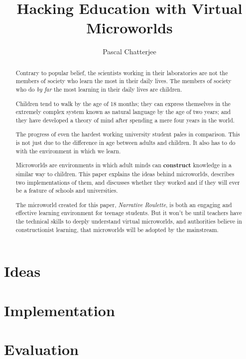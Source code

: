 \documentclass[a4paper]{report}
\title{Hacking Education with Virtual Microworlds}
\author{Pascal Chatterjee}
\begin{document}
\maketitle

\begin{abstract}
Contrary to popular belief, the scientists working in their laboratories are not the members of society who learn the most in their daily lives. The members of society who do \textit{by far} the most learning in their daily lives are children. 

Children tend to walk by the age of 18 months; they can express themselves in the extremely complex system known as natural language by the age of two years; and they have developed a theory of mind after spending a mere four years in the world. 

The progress of even the hardest working university student pales in comparison. This is not just due to the difference in age between adults and children. It also has to do with the environment in which we learn.

Microworlds are environments in which adult minds can \textbf{construct} knowledge in a similar way to children. This paper explains the ideas behind microworlds, describes two implementations of them, and discusses whether they worked and if they will ever be a feature of schools and universities. 

The microworld created for this paper, \textit{Narrative Roulette}, is both an engaging and effective learning environment for teenage students. But it won't be until teachers have the technical skills to deeply understand virtual microworlds, and authorities believe in constructionist learning, that microworlds will be adopted by the mainstream.
\end{abstract}

\tableofcontents

\chapter{Ideas}







\chapter{Implementation}





\chapter{Evaluation}




\end{document}
